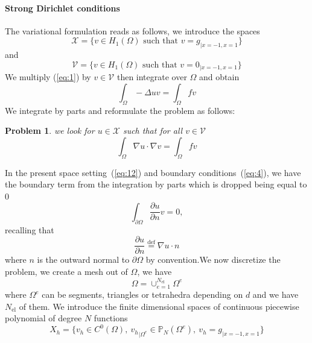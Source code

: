 \documentclass[a4paper]{book}
\newtheorem{problem}{Problem}
\newcommand{\nel}{{\ensuremath{N_{\text{el}}}}}
\begin{document}
\paragraph{Strong Dirichlet conditions}
\label{sec:strong-dirichl-cond}

\noindent
The variational formulation reads as follows, we introduce the spaces
\begin{equation}
  \label{eq:11}
  \mathcal{X} = \Big\{ v \in H_1(\Omega) \text{ such that } v=g_{|x=-1,x=1} \Big\}
\end{equation}
and
\begin{equation}
  \label{eq:12}
  \mathcal{V} = \Big\{ v \in H_1(\Omega) \text{ such that } v=0_{|x=-1,x=1} \Big\}
\end{equation}
We multiply (\ref{eq:1}) by $v \in \mathcal{V}$ then integrate over $\Omega$ and obtain
\begin{equation}
  \label{eq:13}
  \int_\Omega -\Delta u v = \int_\Omega f v
\end{equation}
We integrate by parts and reformulate the problem as follows:
\begin{problem}
we look
for $u \in \mathcal{X}$ such that for all $v \in \mathcal{V}$
\begin{equation}
  \label{eq:14}
  \int_\Omega \nabla u \cdot \nabla v  = \int_\Omega f v
\end{equation}

\end{problem}
In the present space setting~(\ref{eq:12}) and boundary
conditions~(\ref{eq:4}), we have the boundary term from the integration by
parts which is dropped being equal to 0
\begin{equation}
  \label{eq:15}
  \int_{\partial \Omega} \frac{\partial u}{\partial n} v = 0,
\end{equation}
recalling that
\begin{equation}
  \label{eq:21}
  \frac{\partial u}{\partial n} \stackrel{\text{def}}{=} \nabla u \cdot n
\end{equation}
where $n$ is the outward normal to $\partial \Omega$ by convention.We
now discretize the problem, we create a mesh out of $\Omega$, we have
\begin{equation}
  \label{eq:10}
  \Omega = \cup_{e=1}^\nel \Omega^e
\end{equation}
where $\Omega^e$ can be segments, triangles or tetrahedra depending on
$d$ and we have $\nel$ of them. We introduce the finite dimensional
spaces of continuous piecewise polynomial of degree $N$ functions
\begin{equation}
  \label{eq:17}
  X_h = \Big\{ v_h  \in C^0(\Omega),\ {v_h}_{|\Omega^e} \in \mathbb{P}_N( \Omega^e ),\   v_h=g_{|x=-1,x=1}\Big\}
\end{equation}
\end{document}
